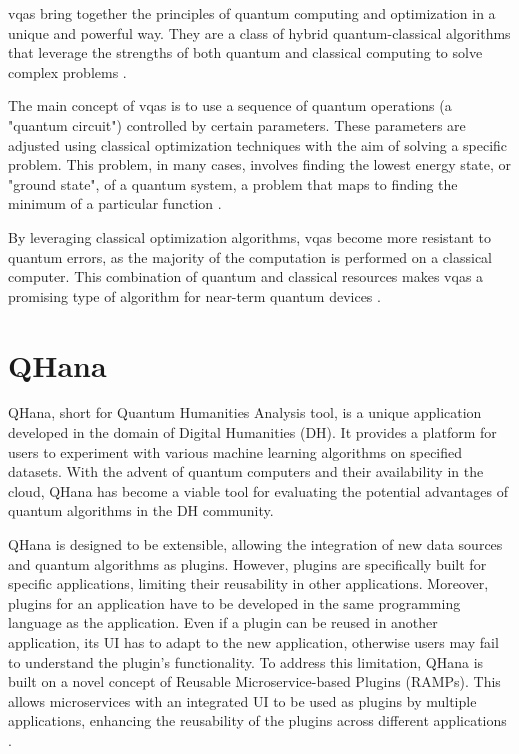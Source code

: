 \documentclass[
  a4paper,  %
  twoside,  %
  bibliography=totoc,
  headsepline,
  cleardoublepage=empty,
  parskip=half,
  draft=false
]{scrbook}
\begin{document}
\glspl{vqa} bring together the principles of quantum computing and optimization in a unique and powerful way.
They are a class of hybrid quantum-classical algorithms that leverage the strengths of both quantum and classical computing to solve complex problems \cite{McClean2016}.

The main concept of \glspl{vqa} is to use a sequence of quantum operations (a "quantum circuit") controlled by certain parameters.
These parameters are adjusted using classical optimization techniques with the aim of solving a specific problem.
This problem, in many cases, involves finding the lowest energy state, or "ground state", of a quantum system, a problem that maps to finding the minimum of a particular function \cite{Peruzzo2013}.

By leveraging classical optimization algorithms, \glspl{vqa} become more resistant to quantum errors, as the majority of the computation is performed on a classical computer.
This combination of quantum and classical resources makes \glspl{vqa} a promising type of algorithm for near-term quantum devices \cite{Moll2017}.

\section{QHana}
\label{sec:qhana}

QHana, short for Quantum Humanities Analysis tool, is a unique application developed in the domain of Digital Humanities (DH).
It provides a platform for users to experiment with various machine learning algorithms on specified datasets.
With the advent of quantum computers and their availability in the cloud, QHana has become a viable tool for evaluating the potential advantages of quantum algorithms in the DH community.

QHana is designed to be extensible, allowing the integration of new data sources and quantum algorithms as plugins.
However, plugins are specifically built for specific applications, limiting their reusability in other applications.
Moreover, plugins for an application have to be developed in the same programming language as the application.
Even if a plugin can be reused in another application, its UI has to adapt to the new application, otherwise users may fail to understand the plugin's functionality.
To address this limitation, QHana is built on a novel concept of Reusable Microservice-based Plugins (RAMPs).
This allows microservices with an integrated UI to be used as plugins by multiple applications, enhancing the reusability of the plugins across different applications \cite{Buehler2022}.
\end{document}
